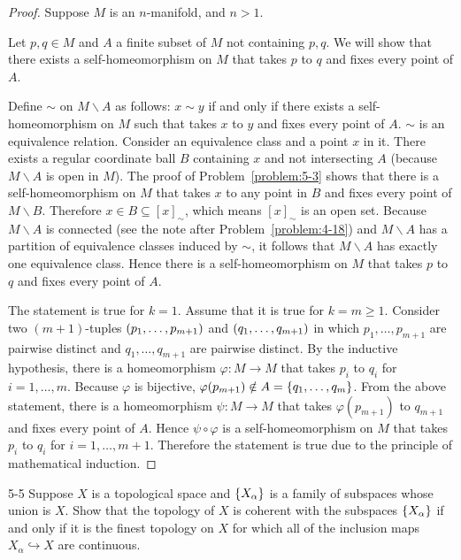 \begin{proof}
	Suppose $M$ is an $n$-manifold, and $n > 1$.

	Let $p, q\in M$ and $A$ a finite subset of $M$ not containing $p, q$. We will show that there exists a self-homeomorphism on $M$ that takes $p$ to $q$ and fixes every point of $A$.

	Define $\sim$ on $M\smallsetminus A$ as follows: $x \sim y$ if and only if there exists a self-homeomorphism on $M$ such that takes $x$ to $y$ and fixes every point of $A$. $\sim$ is an equivalence relation. Consider an equivalence class and a point $x$ in it. There exists a regular coordinate ball $B$ containing $x$ and not intersecting $A$ (because $M\smallsetminus A$ is open in $M$). The proof of Problem~\ref{problem:5-3} shows that there is a self-homeomorphism on $M$ that takes $x$ to any point in $B$ and fixes every point of $M\smallsetminus B$. Therefore $x \in B \subseteq {[x]}_{\sim}$, which means ${[x]}_{\sim}$ is an open set. Because $M\smallsetminus A$ is connected (see the note after Problem~\ref{problem:4-18}) and $M\smallsetminus A$ has a partition of equivalence classes induced by $\sim$, it follows that $M\smallsetminus A$ has exactly one equivalence class. Hence there is a self-homeomorphism on $M$ that takes $p$ to $q$ and fixes every point of $A$.

	The statement is true for $k = 1$. Assume that it is true for $k = m \geq 1$. Consider two $(m+1)$-tuples $\left({p_{1}, \ldots, p_{m+1}}\right)$ and $\left({q_{1}, \ldots, q_{m+1}}\right)$ in which $p_{1}, \ldots, p_{m+1}$ are pairwise distinct and $q_{1}, \ldots, q_{m+1}$ are pairwise distinct. By the inductive hypothesis, there is a homeomorphism $\varphi: M\to M$ that takes $p_{i}$ to $q_{i}$ for $i = 1, \ldots, m$. Because $\varphi$ is bijective, $\varphi(p_{m+1}) \notin A = \left\{{ q_{1}, \ldots, q_{m} }\right\}$. From the above statement, there is a homeomorphism $\psi: M\to M$ that takes $\varphi(p_{m+1})$ to $q_{m+1}$ and fixes every point of $A$. Hence $\psi\circ\varphi$ is a self-homeomorphism on $M$ that takes $p_{i}$ to $q_{i}$ for $i = 1, \ldots, m+1$. Therefore the statement is true due to the principle of mathematical induction.
\end{proof}

\begin{problem}{5-5}\label{problem:5-5}
Suppose $X$ is a topological space and $\left\{{X_{\alpha}}\right\}$ is a family of subspaces whose union is $X$. Show that the topology of $X$ is coherent with the subspaces $\left\{{X_{\alpha}}\right\}$ if and only if it is the finest topology on $X$ for which all of the inclusion maps $X_{\alpha} \hookrightarrow{} X$ are continuous.
\end{problem}

